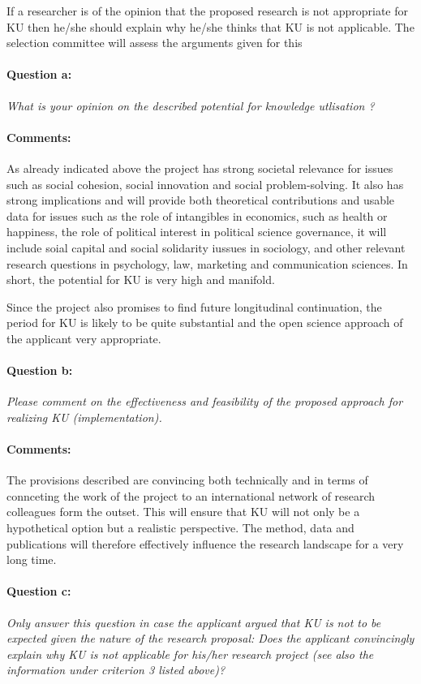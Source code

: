 \documentclass[twocolumn, serif, rga, numeric]{jote-article}
\begin{document}
If a researcher is of the opinion that the proposed research is not appropriate for KU then he/she should explain why he/she thinks that KU is not applicable. The selection committee will assess the arguments given for this
\paragraph{Question a:}
\textit{What is your opinion on the described potential for knowledge utlisation ?}
\paragraph{Comments:}
As already indicated above the project has strong societal relevance for issues such as social cohesion, social innovation and social problem-solving. It also has strong implications and will provide both theoretical contributions and usable data for issues such as the role of intangibles in economics, such as health or happiness, the role of political interest in political science governance, it will include soial capital and social solidarity iussues in sociology, and other relevant research questions in psychology, law, marketing and communication sciences. In short, the potential for KU is very high and manifold.

Since the project also promises to find future longitudinal continuation, the period for KU is likely to be quite substantial and the open science approach of the applicant very appropriate.
\paragraph{Question b:}
\textit{Please comment on the effectiveness and feasibility of the proposed approach for realizing KU (implementation).}
\paragraph{Comments:}
The provisions described are convincing both technically and in terms of connceting the work of the project to an international network of research colleagues form the outset. This will ensure that KU will not only be a hypothetical option but a realistic perspective. The method, data and publications will therefore effectively influence the research landscape for a very long time.
\paragraph{Question c:}
\textit{Only answer this question in case the applicant argued that KU is not to be expected given the nature of the research proposal: Does the applicant convincingly explain why KU is not applicable for his/her research project (see also the information under criterion 3 listed above)?}
\end{document}
